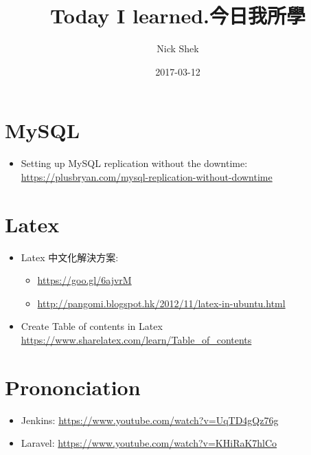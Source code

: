 \documentclass{article}
\title{Today I learned.今日我所學}
\author{Nick Shek}
\date{2017-03-12}
\begin{document}
\maketitle

\clearpage

\tableofcontents

\clearpage

\section{MySQL}

\begin{itemize}
\item Setting up MySQL replication without the downtime: \href{https://plusbryan.com/mysql-replication-without-downtime}{https://plusbryan.com/mysql-replication-without-downtime}
\end{itemize}

\section{Latex}

\begin{itemize}
\item Latex 中文化解決方案:
  \begin{itemize}
    \item \href{https://goo.gl/6ajvrM}{https://goo.gl/6ajvrM}
    \item \href{http://pangomi.blogspot.hk/2012/11/latex-in-ubuntu.html}{http://pangomi.blogspot.hk/2012/11/latex-in-ubuntu.html}
  \end{itemize}
\item Create Table of contents in Latex \href{https://www.sharelatex.com/learn/Table\_of\_contents}{https://www.sharelatex.com/learn/Table\_of\_contents}
\end{itemize}

\section{Prononciation}

\begin{itemize}
\item Jenkins: \href{https://www.youtube.com/watch?v=UqTD4gQz76g}{https://www.youtube.com/watch?v=UqTD4gQz76g}
\item Laravel: \href{https://www.youtube.com/watch?v=KHiRaK7hlCo}{https://www.youtube.com/watch?v=KHiRaK7hlCo}
\end{itemize}
\end{document}
